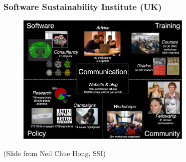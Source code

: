 \begin{frame}
\frametitle{Software Sustainability Institute (UK)}

\begin{figure}[htbp]
\begin{center}
\includegraphics[width=0.75\textwidth]{images/ssi-uk-activities.png}
\end{center}
\end{figure}

\small{(Slide from Neil Chue Hong, SSI)}

\end{frame}


